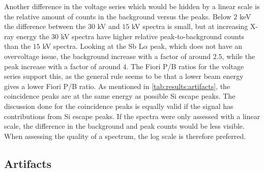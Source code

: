 Another difference in the voltage series which would be hidden by a linear scale is the relative amount of counts in the background versus the peaks.
Below $2$ keV the difference between the $30$ kV and $15$ kV spectra is small, but at increasing X-ray energy the $30$ kV spectra have higher relative peak-to-background counts than the $15$ kV spectra.
Looking at the Sb L$\alpha$ peak, which does not have an overvoltage issue, the background increase with a factor of around $2.5$, while the peak increase with a factor of around $4$.
The Fiori P/B ratios for the voltage series support this, as the general rule seems to be that a lower beam energy gives a lower Fiori P/B ratio.
As mentioned in \cref{tab:results:artifacts}, the coincidence peaks are at the same energy as possible Si escape peaks.
The discussion done for the coincidence peaks is equally valid if the signal has contributions from Si escape peaks.
If the spectra were only assessed with a linear scale, the difference in the background and peak counts would be less visible.
When assessing the quality of a spectrum, the log scale is therefore preferred.





\subsection{Artifacts}
\label{discussion:artifacts}

